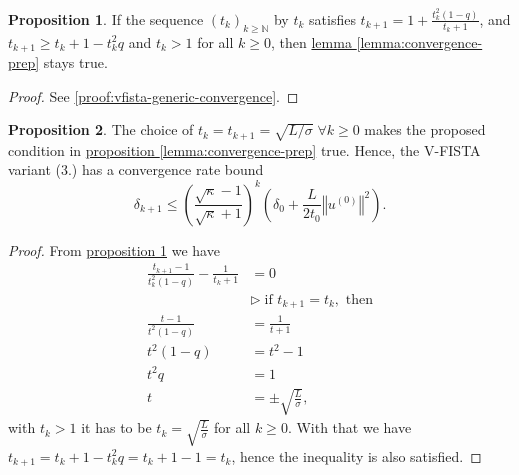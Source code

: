 \documentclass[]{article}
\theoremstyle{definition}
\newtheorem{prop}{Proposition}[section]  %
\numberwithin{equation}{subsection}
\begin{document}
        \begin{prop}\label{prop:vfista-generic-convergence}
            If the sequence $(t_k)_{k \ge \mathbb N}$ by $t_{k}$ satisfies 
            $t_{k + 1} = 1 + \frac{t_k^2(1 - q)}{t_k + 1}$, and $t_{k + 1} \ge t_k + 1 - t_k^2q$ and $t_k > 1$ for all $k\ge 0$, then \hyperref[lemma:convergence-prep]{lemma \ref*{lemma:convergence-prep}} stays true. 
        \end{prop}
        \begin{proof}
            See \hyperref[proof:vfista-generic-convergence]{\ref*{proof:vfista-generic-convergence}}. 
        \end{proof}
        \begin{prop}\label{prop:vfista-linear-convergence}
            The choice of $t_k = t_{k + 1} = \sqrt{L/\sigma}\; \forall k\ge 0$ makes the proposed condition in \hyperref[lemma:convergence-prep]{proposition \ref*{lemma:convergence-prep}} true. 
            Hence, the V-FISTA variant (3.) has a convergence rate bound 
            \[
                \delta_{k + 1}
                \le 
                \left(
                    \frac{\sqrt{\kappa} - 1}{\sqrt{\kappa} + 1}
                \right)^k\left(
                    \delta_0 + \frac{L}{2t_0}\left\Vert
                        u^{(0)}
                    \right\Vert^2
                \right).     
            \]
        \end{prop}
        \begin{proof}
            From \hyperref[prop:vfista-generic-convergence]{proposition \ref*{prop:vfista-generic-convergence}} we have 
            \begin{align*}
                \frac{t_{k + 1} - 1}{t^2_k(1 - q)}
                    -
                \frac{1}{t_k + 1} &= 0
                \\
                & \triangleright\; \text{if } t_{k + 1} = t_k, \text{ then}
                \\
                \frac{t - 1}{t^2(1 - q)} &= \frac{1}{t + 1}
                \\
                t^2(1 - q) 
                &= t^2 - 1
                \\
                t^2q &= 1
                \\
                t &= \pm \sqrt{\frac{L}{\sigma}}, 
            \end{align*}
            with $t_k > 1$ it has to be $t_k = \sqrt{\frac{L}{\sigma}}$ for all $k \ge 0$. 
            With that we have $t_{k + 1} = t_{k} + 1 - t_k^2 q = t_k + 1 - 1 = t_k$, hence the inequality is also satisfied. 
        \end{proof}
\end{document}
